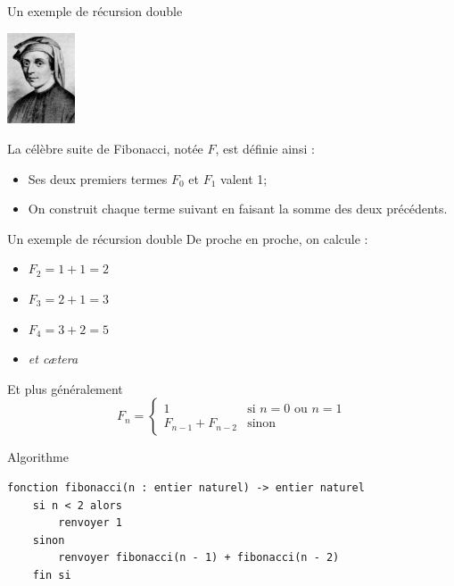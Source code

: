 \documentclass[10pt]{nsibeamer}
\begin{document}
\begin{frame}{Un exemple de récursion double}
    \pause
    \begin{center}
        \includegraphics[width=2cm]{img/fibonacci}
    \end{center}
    La célèbre suite de Fibonacci, notée $F$, est définie ainsi :\pause
    \begin{itemize}
        \item   Ses deux premiers termes $F_0$ et $F_1$ valent 1;\pause
        \item   On construit chaque terme suivant en faisant la somme des deux précédents.
    \end{itemize}
\end{frame}

%

\begin{frame}{Un exemple de récursion double}
    De proche en proche, on calcule :\pause
    \begin{itemize}
        \item $F_2=1+1=2$\pause
        \item  $F_3=2+1=3$\pause
        \item $F_4=3+2=5$\pause
        \item \textit{et c\ae tera}\pause
    \end{itemize}
    Et plus généralement\pause
    $$F_n=\begin{cases}
            1               & \mbox{si } n=0\mbox{ ou }n=1 \\
            F_{n-1}+F_{n-2} & \mbox{sinon}
        \end{cases}$$
\end{frame}

%

\begin{frame}[fragile]{Algorithme}
    
        \begin{verbatim}
fonction fibonacci(n : entier naturel) -> entier naturel
    si n < 2 alors
        renvoyer 1
    sinon
        renvoyer fibonacci(n - 1) + fibonacci(n - 2)
    fin si
\end{verbatim}
    
\end{frame}
\end{document}

